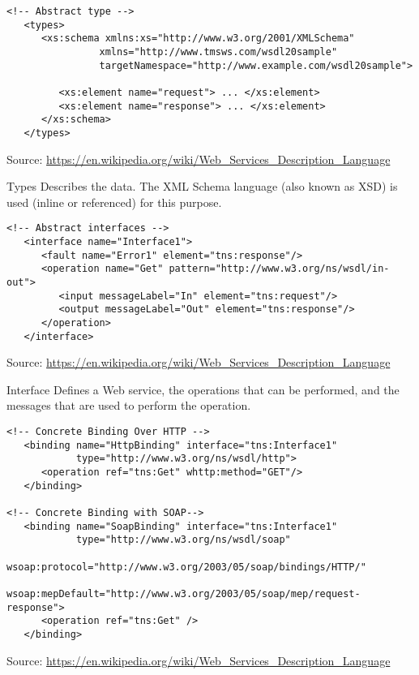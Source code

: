 \documentclass[Screen16to9,17pt]{foils}
\begin{document}

\begin{verbatim}
<!-- Abstract type -->
   <types>
      <xs:schema xmlns:xs="http://www.w3.org/2001/XMLSchema"
                xmlns="http://www.tmsws.com/wsdl20sample"
                targetNamespace="http://www.example.com/wsdl20sample">

         <xs:element name="request"> ... </xs:element>
         <xs:element name="response"> ... </xs:element>
      </xs:schema>
   </types>

\end{verbatim}
Source: \url{https://en.wikipedia.org/wiki/Web_Services_Description_Language}

Types	Describes the data. The XML Schema language (also known as XSD) is used (inline or referenced) for this purpose.



\begin{verbatim}
<!-- Abstract interfaces -->
   <interface name="Interface1">
      <fault name="Error1" element="tns:response"/>
      <operation name="Get" pattern="http://www.w3.org/ns/wsdl/in-out">
         <input messageLabel="In" element="tns:request"/>
         <output messageLabel="Out" element="tns:response"/>
      </operation>
   </interface>
\end{verbatim}
Source: \url{https://en.wikipedia.org/wiki/Web_Services_Description_Language}

Interface	Defines a Web service, the operations that can be performed, and the messages that are used to perform the operation.


\begin{verbatim}
<!-- Concrete Binding Over HTTP -->
   <binding name="HttpBinding" interface="tns:Interface1"
            type="http://www.w3.org/ns/wsdl/http">
      <operation ref="tns:Get" whttp:method="GET"/>
   </binding>

<!-- Concrete Binding with SOAP-->
   <binding name="SoapBinding" interface="tns:Interface1"
            type="http://www.w3.org/ns/wsdl/soap"
            wsoap:protocol="http://www.w3.org/2003/05/soap/bindings/HTTP/"
            wsoap:mepDefault="http://www.w3.org/2003/05/soap/mep/request-response">
      <operation ref="tns:Get" />
   </binding>
\end{verbatim}
Source: \url{https://en.wikipedia.org/wiki/Web_Services_Description_Language}
\end{document}
